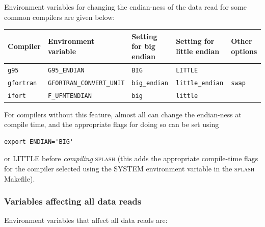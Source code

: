 \documentclass[a4paper,10pt]{article}
\newcommand{\splash}{\textsc{splash }}
\begin{document}
Environment variables for changing the endian-ness of the data read for some common compilers are given below:
\begin{table}[h!]
\begin{tabular}{lllll}
Compiler & Environment variable & Setting for big endian & Setting for little endian & Other options \\
\hline
\verb+g95+ & \verb+G95_ENDIAN+ & \verb+BIG+ & \verb+LITTLE+ &  \\
\verb+gfortran+ & \verb+GFORTRAN_CONVERT_UNIT+ & \verb+big_endian+ & \verb+little_endian+  & \verb+swap+ \\
\verb+ifort+ & \verb+F_UFMTENDIAN+ & \verb+big+ & \verb+little+ & \\
\hline
\end{tabular}
\end{table}

 For compilers without this feature, almost all can change the endian-ness at compile time, and the appropriate flags for doing so can be set using
\begin{verbatim}
export ENDIAN='BIG'
\end{verbatim}
or LITTLE before \emph{compiling} \splash (this adds the appropriate compile-time flags for the compiler selected using the SYSTEM environment variable in the \splash Makefile). 

\subsubsection{ Variables affecting all data reads}
Environment variables that affect all data reads are:\newline
\end{document}

